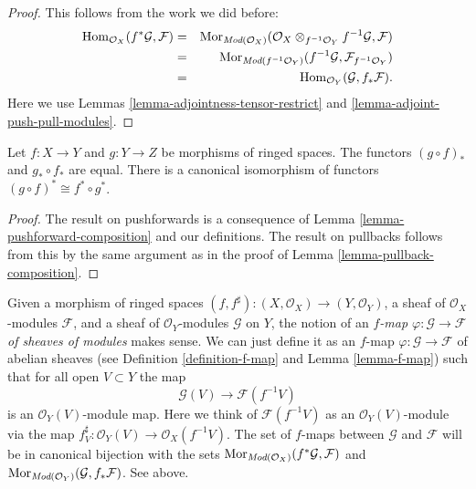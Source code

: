 \begin{proof}
This follows from the work we did before:
\begin{eqnarray*}
\mathop{\mathrm{Hom}}\nolimits_{\mathcal{O}_X}(f^*\mathcal{G}, \mathcal{F})
& = &
\mathop{\mathrm{Mor}}\nolimits_{\textit{Mod}(\mathcal{O}_X)}(
\mathcal{O}_X \otimes_{f^{-1}\mathcal{O}_Y} f^{-1}\mathcal{G}, \mathcal{F}) \\
& = &
\mathop{\mathrm{Mor}}\nolimits_{\textit{Mod}(f^{-1}\mathcal{O}_Y)}(
f^{-1}\mathcal{G}, \mathcal{F}_{f^{-1}\mathcal{O}_Y}) \\
& = &
\mathop{\mathrm{Hom}}\nolimits_{\mathcal{O}_Y}(\mathcal{G}, f_*\mathcal{F}).
\end{eqnarray*}
Here we use Lemmas \ref{lemma-adjointness-tensor-restrict}
and \ref{lemma-adjoint-push-pull-modules}.
\end{proof}

\begin{lemma}
\label{lemma-push-pull-composition-modules}
Let $f : X \to Y$ and $g : Y \to Z$ be morphisms of ringed spaces.
The functors $(g \circ f)_*$ and $g_* \circ f_*$ are equal.
There is a canonical isomorphism of functors
$(g \circ f)^* \cong f^* \circ g^*$.
\end{lemma}

\begin{proof}
The result on pushforwards is a consequence of Lemma
\ref{lemma-pushforward-composition} and our definitions.
The result on pullbacks follows from this by the same
argument as in the proof of Lemma \ref{lemma-pullback-composition}.
\end{proof}


\noindent
Given a morphism of ringed spaces
$(f, f^\sharp) : (X, \mathcal{O}_X) \to (Y, \mathcal{O}_Y)$,
a sheaf of $\mathcal{O}_X$-modules $\mathcal{F}$, and
a sheaf of $\mathcal{O}_Y$-modules $\mathcal{G}$ on $Y$,
the notion of an {\it $f$-map $\varphi : \mathcal{G} \to \mathcal{F}$
of sheaves of modules} makes sense. We can just define
it as an $f$-map $\varphi : \mathcal{G} \to \mathcal{F}$
of abelian sheaves (see Definition \ref{definition-f-map} and
Lemma \ref{lemma-f-map}) such that for all open $V \subset Y$ the map
$$
\mathcal{G}(V) \longrightarrow \mathcal{F}(f^{-1}V)
$$
is an $\mathcal{O}_Y(V)$-module map. Here we think of
$\mathcal{F}(f^{-1}V)$ as an $\mathcal{O}_Y(V)$-module
via the map $f^\sharp_V : \mathcal{O}_Y(V) \to \mathcal{O}_X(f^{-1}V)$.
The set of $f$-maps between
$\mathcal{G}$ and $\mathcal{F}$ will be in canonical bijection
with the sets
$\mathop{\mathrm{Mor}}\nolimits_{\textit{Mod}(\mathcal{O}_X)}(f^*\mathcal{G}, \mathcal{F})$
and
$\mathop{\mathrm{Mor}}\nolimits_{\textit{Mod}(\mathcal{O}_Y)}(\mathcal{G}, f_*\mathcal{F})$.
See above.

